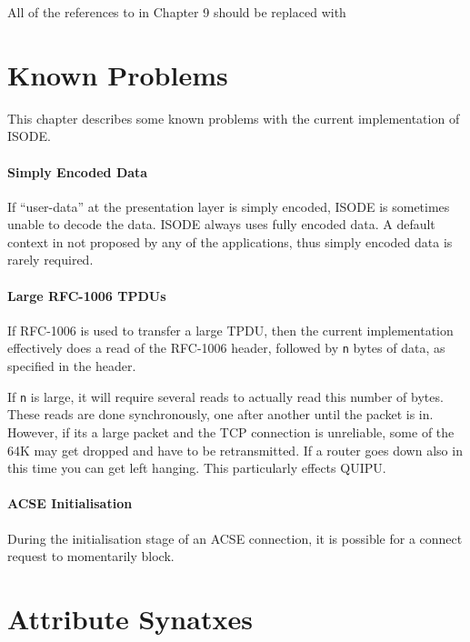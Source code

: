 All of the references to  in Chapter 9 should be replaced
with 

\chapter{Known Problems}

This chapter describes some known problems with the current
implementation of ISODE.

\subsubsection{Simply Encoded Data}

If ``user-data'' at the presentation layer is simply encoded, ISODE is
sometimes unable to decode the data.  ISODE always uses fully encoded
data.  A default context in not proposed by any of the applications,
thus simply encoded data is rarely required.

\subsubsection{Large RFC-1006 TPDUs}

If RFC-1006 is used to transfer a large TPDU, then the current
implementation effectively does a read of the RFC-1006 header,
followed by \verb+n+ bytes of data, as specified in the header.

If \verb+n+ is large, it will require several reads to 
actually read this number of bytes. These reads are done
synchronously, one after another until the packet is in. However, if
its a large packet and the TCP connection is unreliable, some of the 64K
may get dropped and have to be retransmitted.
If a router goes down also in this time you can get left hanging.
This particularly effects QUIPU.

\subsubsection{ACSE Initialisation}

During the initialisation stage of an ACSE connection, it is possible
for a connect request to momentarily block.

\appendix





\chapter{Attribute Synatxes}

